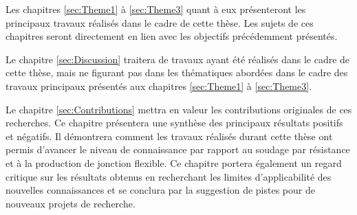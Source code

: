 Les chapitres \ref{sec:Theme1} à \ref{sec:Theme3} quant à eux présenteront les principaux travaux réalisés dans le cadre de cette thèse. 
Les sujets de ces chapitres seront directement en lien avec les objectifs précédemment présentés. 

Le chapitre \ref{sec:Discussion} traitera de travaux ayant été réalisés dans le cadre de cette thèse, mais ne figurant pas dans les thématiques abordées dans le cadre des travaux principaux présentés aux chapitres \ref{sec:Theme1} à \ref{sec:Theme3}.  

Le chapitre \ref{sec:Contributions} mettra en valeur les contributions originales de ces recherches. 
Ce chapitre présentera une synthèse des principaux résultats positifs et négatifs. 
Il démontrera comment les travaux réalisés durant cette thèse ont permis d'avancer le niveau de connaissance par rapport au soudage par résistance et à la production de jonction flexible. 
Ce chapitre portera également un regard critique sur les résultats obtenus en recherchant les limites d'applicabilité des nouvelles connaissances et se conclura par la suggestion de pistes pour de nouveaux projets de recherche. 
